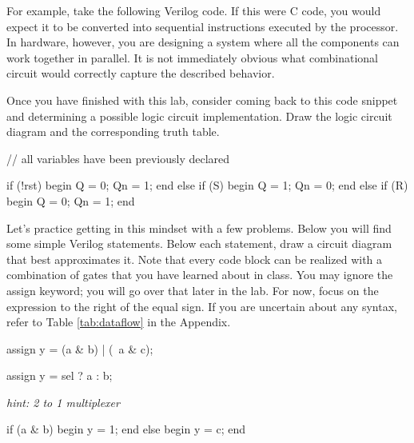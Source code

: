 \documentclass[12pt]{labmanual}
\begin{document}
For example, take the following Verilog code. If this were C code, you would expect it to be converted into sequential instructions executed by the processor. In hardware, however, you are designing a system where all the components can work together in parallel. It is not immediately obvious what combinational circuit would correctly capture the described behavior.

\begin{bonusquestion}
Once you have finished with this lab, consider coming back to this code snippet and determining a possible logic circuit implementation. Draw the logic circuit diagram and the corresponding truth table.
\end{bonusquestion}

\begin{codeblock}[language=Verilog][H]
    // all variables have been previously declared
    
    if (!rst) begin
      Q  = 0;
      Qn = 1;
    end else if (S) begin
      Q  = 1;
      Qn = 0;
    end else if (R) begin
      Q  = 0;
      Qn = 1;
    end
    
\end{codeblock}
\clearpage
\begin{question}[Practice]
    Let's practice getting in this mindset with a few problems. Below you will find some simple Verilog statements. Below each statement, draw a circuit diagram that best approximates it. Note that every code block can be realized with a combination of gates that you have learned about in class. You may ignore the assign keyword; you will go over that later in the lab. For now, focus on the expression to the right of the equal sign. If you are uncertain about any syntax, refer to Table \ref{tab:dataflow} in the Appendix.
\end{question}




\begin{codeblock}[language=Verilog]
    assign y = (a & b) | (~a & c);
\end{codeblock}
\vspace{3\textheight}
\begin{codeblock}[language=Verilog]
    assign y = sel ? a : b;
\end{codeblock}
\textit{\small{hint: 2 to 1 multiplexer}}
\vspace{16em}
\begin{codeblock}[language=Verilog]  
    if (a & b) begin
        y = 1;
    end else begin
        y = c;
    end
\end{codeblock}
\clearpage
\end{document}
